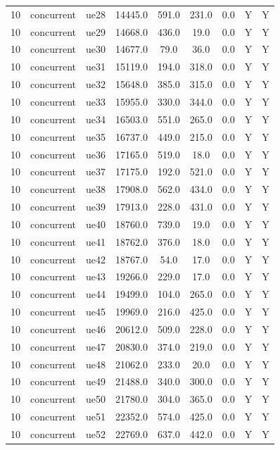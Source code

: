\begin{table}[ht]
\begin{tabular}{|c|c|c|c|c|c|c|c|c|}
10 & concurrent & ue28 & 14445.0 & 591.0 & 231.0 & 0.0 & Y & Y \\
10 & concurrent & ue29 & 14668.0 & 436.0 & 19.0 & 0.0 & Y & Y \\
10 & concurrent & ue30 & 14677.0 & 79.0 & 36.0 & 0.0 & Y & Y \\
10 & concurrent & ue31 & 15119.0 & 194.0 & 318.0 & 0.0 & Y & Y \\
10 & concurrent & ue32 & 15648.0 & 385.0 & 315.0 & 0.0 & Y & Y \\
10 & concurrent & ue33 & 15955.0 & 330.0 & 344.0 & 0.0 & Y & Y \\
10 & concurrent & ue34 & 16503.0 & 551.0 & 265.0 & 0.0 & Y & Y \\
10 & concurrent & ue35 & 16737.0 & 449.0 & 215.0 & 0.0 & Y & Y \\
10 & concurrent & ue36 & 17165.0 & 519.0 & 18.0 & 0.0 & Y & Y \\
10 & concurrent & ue37 & 17175.0 & 192.0 & 521.0 & 0.0 & Y & Y \\
10 & concurrent & ue38 & 17908.0 & 562.0 & 434.0 & 0.0 & Y & Y \\
10 & concurrent & ue39 & 17913.0 & 228.0 & 431.0 & 0.0 & Y & Y \\
10 & concurrent & ue40 & 18760.0 & 739.0 & 19.0 & 0.0 & Y & Y \\
10 & concurrent & ue41 & 18762.0 & 376.0 & 18.0 & 0.0 & Y & Y \\
10 & concurrent & ue42 & 18767.0 & 54.0 & 17.0 & 0.0 & Y & Y \\
10 & concurrent & ue43 & 19266.0 & 229.0 & 17.0 & 0.0 & Y & Y \\
10 & concurrent & ue44 & 19499.0 & 104.0 & 265.0 & 0.0 & Y & Y \\
10 & concurrent & ue45 & 19969.0 & 216.0 & 425.0 & 0.0 & Y & Y \\
10 & concurrent & ue46 & 20612.0 & 509.0 & 228.0 & 0.0 & Y & Y \\
10 & concurrent & ue47 & 20830.0 & 374.0 & 219.0 & 0.0 & Y & Y \\
10 & concurrent & ue48 & 21062.0 & 233.0 & 20.0 & 0.0 & Y & Y \\
10 & concurrent & ue49 & 21488.0 & 340.0 & 300.0 & 0.0 & Y & Y \\
10 & concurrent & ue50 & 21780.0 & 304.0 & 365.0 & 0.0 & Y & Y \\
10 & concurrent & ue51 & 22352.0 & 574.0 & 425.0 & 0.0 & Y & Y \\
10 & concurrent & ue52 & 22769.0 & 637.0 & 442.0 & 0.0 & Y & Y \\

\end{tabular}
\end{table}
